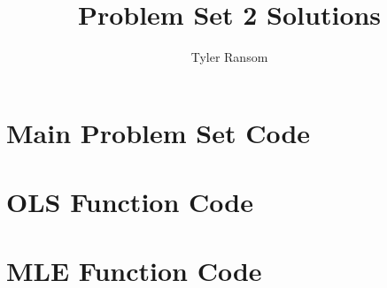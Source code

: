 \documentclass[12pt,english]{article}
\title{Problem Set 2 Solutions}
\author{Tyler Ransom}
\begin{document}
\maketitle

\section{Main Problem Set Code}


\pagebreak{}
\section{OLS Function Code}

\bigskip{}
\bigskip{}
\section{MLE Function Code}

\end{document}
